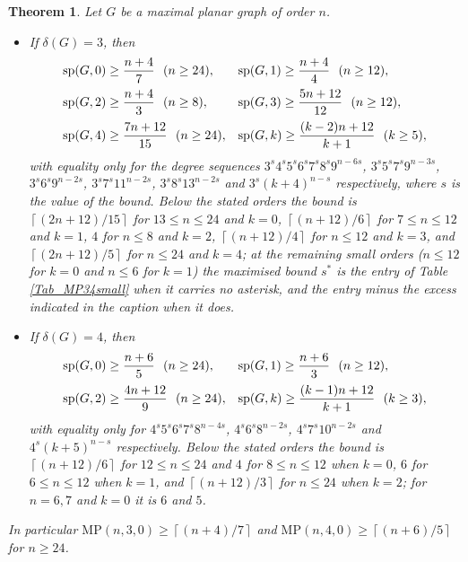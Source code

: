 \documentclass[10pt,a4paper]{article}
\newtheorem{theorem}{Theorem}
\begin{document}
\begin{theorem}
\label{Tm_planar34}Let $G$ be a maximal planar graph of order $n$.

\begin{itemize}
\item[\textrm{(i)}] If $\delta (G)=3$, then
\[
\begin{array}
[c]{ll}%
\mathrm{sp}(G,0)\geq \dfrac{n+4}{7}\ \ (n\geq 24), & \mathrm{sp}(G,1)\geq \dfrac{n+4}{4}\ \ (n\geq
12),\\[3mm]
\mathrm{sp}(G,2)\geq \dfrac{n+4}{3}\ \ (n\geq 8), & \mathrm{sp}(G,3)\geq \dfrac{5n+12}{12}\ \ (n\geq
12),\\[3mm]
\mathrm{sp}(G,4)\geq \dfrac{7n+12}{15}\ \ (n\geq 24), & \mathrm{sp}(G,k)\geq \dfrac{(k-2)n+12}{k+1}\
\ (k\geq 5),
\end{array}
\]
with equality only for the degree sequences $3^{s}4^{s}5^{s}6^{s}7^{s}8^{s}9^{n-6s}$,
$3^{s}5^{s}7^{s}9^{n-3s}$, $3^{s}6^{s}9^{n-2s}$, $3^{s}7^{s}11^{n-2s}$, $3^{s}8^{s}13^{n-2s}$ and
$3^{s}(k+4)^{n-s}$ respectively, where $s$ is the value of the bound. Below the stated orders the
bound is $\left\lceil (2n+12)/15\right\rceil $ for $13\leq n\leq 24$ and $k=0$,
$\left\lceil (n+12)/6\right\rceil $ for $7\leq n\leq 12$ and $k=1$, $4$ for $n\leq 8$ and $k=2$,
$\left\lceil (n+12)/4\right\rceil $ for $n\leq 12$ and $k=3$, and $\left\lceil (2n+12)/5\right\rceil $
for $n\leq 24$ and $k=4$; at the remaining small orders ($n\leq 12$ for $k=0$ and $n\leq 6$ for
$k=1$) the maximised bound $s^{\ast }$ is the entry of Table \ref{Tab_MP34small} when it carries no asterisk, and the
entry minus the excess indicated in the caption when it does.

\item[\textrm{(ii)}] If $\delta (G)=4$, then
\[
\begin{array}
[c]{ll}%
\mathrm{sp}(G,0)\geq \dfrac{n+6}{5}\ \ (n\geq 24), & \mathrm{sp}(G,1)\geq \dfrac{n+6}{3}\ \ (n\geq
12),\\[3mm]
\mathrm{sp}(G,2)\geq \dfrac{4n+12}{9}\ \ (n\geq 24), & \mathrm{sp}(G,k)\geq \dfrac{(k-1)n+12}{k+1}\ \
(k\geq 3),
\end{array}
\]
with equality only for $4^{s}5^{s}6^{s}7^{s}8^{n-4s}$, $4^{s}6^{s}8^{n-2s}$, $4^{s}7^{s}10^{n-2s}$
and $4^{s}(k+5)^{n-s}$ respectively. Below the stated orders the bound is
$\left\lceil (n+12)/6\right\rceil $ for $12\leq n\leq 24$ and $4$ for $8\leq n\leq 12$ when $k=0$,
$6$ for $6\leq n\leq 12$ when $k=1$, and $\left\lceil (n+12)/3\right\rceil $ for $n\leq 24$ when
$k=2$; for $n=6,7$ and $k=0$ it is $6$ and $5$.
\end{itemize}

In particular $\mathrm{MP}(n,3,0)\geq \left\lceil (n+4)/7\right\rceil $ and $\mathrm{MP}(n,4,0)\geq
\left\lceil (n+6)/5\right\rceil $ for $n\geq 24$.
\end{theorem}
\end{document}
